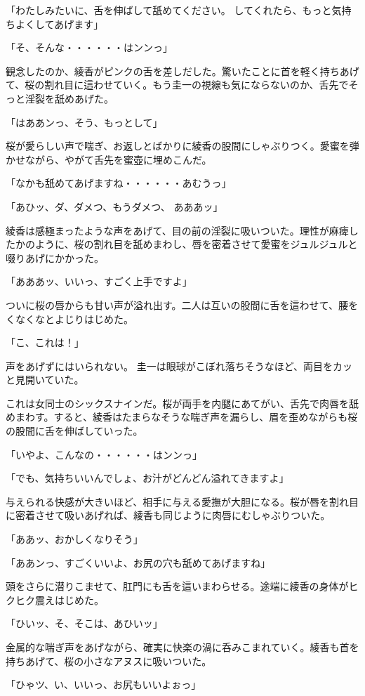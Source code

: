 ﻿\documentclass[book,tate]{jlreq}
\begin{document}
「わたしみたいに、舌を伸ばして舐めてください。 してくれたら、もっと気持ちよくしてあげます」

「そ、そんな・・・・・・はンンっ」

観念したのか、綾香がピンクの舌を差しだした。驚いたことに首を軽く持ちあげて、桜の割れ目に這わせていく。もう圭一の視線も気にならないのか、舌先でそっと淫裂を舐めあげた。

「はああンっ、そう、もっとして」

桜が愛らしい声で喘ぎ、お返しとばかりに綾香の股間にしゃぶりつく。愛蜜を弾かせながら、やがて舌先を蜜壺に埋めこんだ。

「なかも舐めてあげますね・・・・・・あむうっ」

「あひッ、ダ、ダメつ、もうダメつ、 あああッ」

綾香は感極まったような声をあげて、目の前の淫裂に吸いついた。理性が麻痺したかのように、桜の割れ目を舐めまわし、唇を密着させて愛蜜をジュルジュルと啜りあげにかかった。

「あああッ、いいっ、すごく上手ですよ」

ついに桜の唇からも甘い声が溢れ出す。二人は互いの股間に舌を這わせて、腰をくなくなとよじりはじめた。

「こ、これは！」

声をあげずにはいられない。 圭一は眼球がこぼれ落ちそうなほど、両目をカッと見開いていた。

これは女同士のシックスナインだ。桜が両手を内腿にあてがい、舌先で肉唇を舐めまわす。すると、綾香はたまらなそうな喘ぎ声を漏らし、眉を歪めながらも桜の股間に舌を伸ばしていった。

「いやよ、こんなの・・・・・・はンンっ」

「でも、気持ちいいんでしょ、お汁がどんどん溢れてきますよ」

与えられる快感が大きいほど、相手に与える愛撫が大胆になる。桜が唇を割れ目に密着させて吸いあげれば、綾香も同じように肉唇にむしゃぶりついた。

「ああッ、おかしくなりそう」

「ああンっ、すごくいいよ、お尻の穴も舐めてあげますね」

頭をさらに潜りこませて、肛門にも舌を這いまわらせる。途端に綾香の身体がヒクヒク震えはじめた。

「ひいッ、そ、そこは、あひいッ」

金属的な喘ぎ声をあげながら、確実に快楽の渦に呑みこまれていく。綾香も首を持ちあげて、桜の小さなアヌスに吸いついた。

「ひゃツ、い、いいっ、お尻もいいよぉっ」
\end{document}
